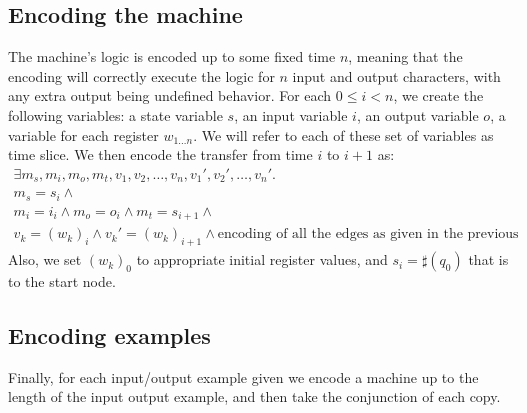 \documentclass{article}
\newcommand{\enc}{\sharp}
\theoremstyle{definition}
\begin{document}
\subsection{Encoding the machine}
The machine's logic is encoded up to some fixed time $n$,
meaning that the encoding will correctly execute the logic for $n$ input and output characters, with any extra output being undefined behavior.
For each $0 \le i < n$, we create the following variables: a state variable $s$, an input variable $i$, an output variable $o$, a variable for each register $w_{1 \ldots n}$.
We will refer to each of these set of variables as time slice.
We then encode the transfer from time $i$ to $i+1$ as:
\begin{align*}
\exists m_s, m_i, m_o, m_t, v_1, v_2, \ldots, v_n, v_1', v_2', \ldots, v_n'. \\
m_s = s_i \wedge \\ 
m_i = i_i \wedge 
m_o = o_i \wedge 
m_t = s_{i+1} \wedge \\ 
v_k = (w_k)_i \wedge
v_k' = (w_k)_{i+1} \wedge 
\text{encoding of all the edges as given in the previous}
\end{align*}
Also, we set $(w_k)_0$ to appropriate initial register values,
and $s_i = \enc(q_0)$ that is to the start node.

\subsection{Encoding examples}
Finally, for each input/output example given we encode a machine up to 
the length of the input output example,
and then take the conjunction of each copy.
\end{document}
